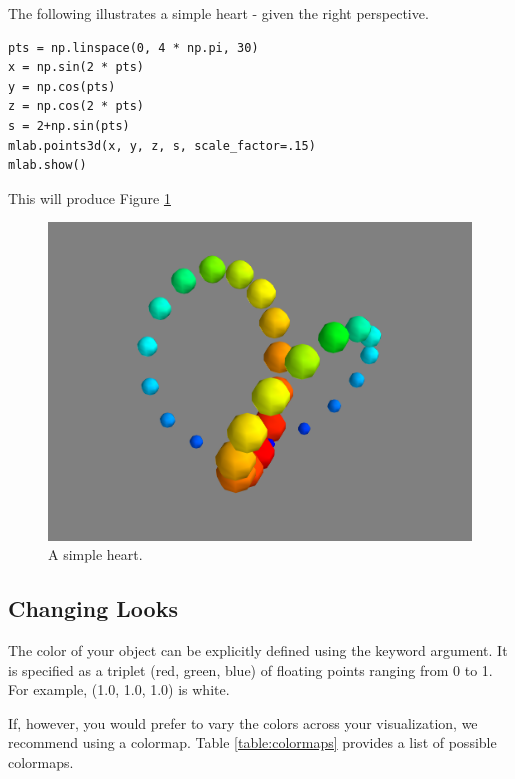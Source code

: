 The following illustrates a simple heart - given the right perspective. 
\begin{lstlisting}
pts = np.linspace(0, 4 * np.pi, 30)
x = np.sin(2 * pts)
y = np.cos(pts)
z = np.cos(2 * pts)
s = 2+np.sin(pts)
mlab.points3d(x, y, z, s, scale_factor=.15)
mlab.show()
\end{lstlisting}
This will produce Figure \ref{fig:points3d}

\begin{figure} 
\includegraphics[width=\textwidth]{points3d.png}
\caption{A simple heart.} 
\label{fig:points3d}
\end{figure}

\subsection*{Changing Looks}
The color of your object can be explicitly defined using the  
keyword argument. It is specified as a triplet (red, green, blue) of 
floating points ranging from 0 to 1. 
For example, (1.0, 1.0, 1.0) is white. 

If, however, you would prefer to vary the colors across your visualization, 
we recommend using a colormap. Table \ref{table:colormaps} provides 
a list of possible colormaps. 

